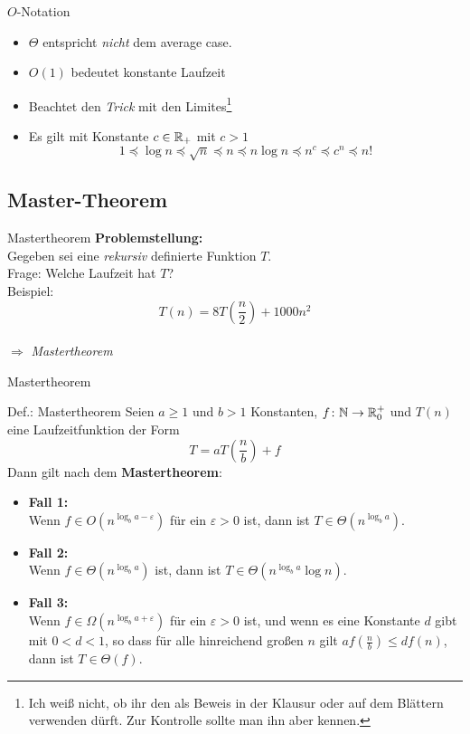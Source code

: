 \begin{frame}{$O$-Notation} %
    \begin{itemize}
    	\item $\Theta$ entspricht \emph{nicht} dem average case.
    	\item $O(1)$ bedeutet konstante Laufzeit
    	\item Beachtet den \emph{Trick} mit den Limites\footnote{Ich weiß nicht, ob ihr den als Beweis in der Klausur oder auf dem Blättern verwenden dürft. Zur Kontrolle sollte man ihn aber kennen.}
        \item Es gilt mit Konstante $c \in \mathbb{R}_+$ mit $c>1$
        \[
            1 \preceq \log n \preceq \sqrt{n} \preceq n \preceq n \log n \preceq n^c \preceq c^n \preceq n!
        \]
    \end{itemize}
\end{frame}

\subsection{Master-Theorem}
\begin{frame}{Mastertheorem}
    \textbf{Problemstellung:}\\[1cm]    
    Gegeben sei eine \emph{rekursiv} definierte Funktion $T$.\\
    Frage: Welche Laufzeit hat $T$?\\[1cm]
    Beispiel:
    \[
    	T(n) = 8 T \left(\frac{n}{2} \right) + 1000n^2
    \]
    \\[1cm]\centering$\Rightarrow$ \emph{Mastertheorem}
\end{frame}

\begin{frame}{Mastertheorem}
    \begin{block}{Def.: Mastertheorem}
    	Seien $a\geq 1$ und $b>1$ Konstanten, $f \colon \mathbb{N} \to \mathbb{R}^+_0$ und $T(n)$ eine Laufzeitfunktion der Form
    	\[
			T = a T\left(\frac{n}{b}\right) + f 
		\]
		Dann gilt nach dem \textbf{Mastertheorem}:
		\begin{itemize}
			\item \textbf{Fall 1:} \\ Wenn $f \in O(n^{\log_b a -\varepsilon})$ für ein $\varepsilon>0$ ist, dann ist $T\in \Theta(n^{\log_b a})$.
			\item \textbf{Fall 2:} \\ Wenn $f \in \Theta(n^{\log_b a})$ ist, dann ist $T\in \Theta(n^{\log_b a}\log n)$.
			\item\textbf{Fall 3:} \\  Wenn $f \in \Omega(n^{\log_b a +\varepsilon})$ für ein $\varepsilon>0$ ist, und wenn es eine Konstante $d$ gibt mit $0<d<1$, so dass für alle hinreichend großen $n$ gilt $af\left(\frac{n}{b}\right)\leq d f(n)$, dann ist $T\in \Theta(f)$.
		\end{itemize}
    \end{block}
\end{frame}

